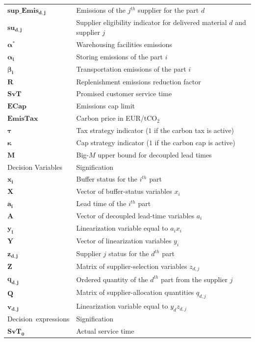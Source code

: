 \documentclass[preprint,12pt,authoryear]{elsarticle}
\begin{document}
\begin{longtable}{@{}p{}p{}@{}}
    $\bm{sup\_Emis_{d,j}}$ & Emissions of the $j^{th}$ supplier for the part $d$\\
    $\bm{su_{d,j}}$ & Supplier eligibility indicator for delivered material $d$ and supplier $j$\\
    $\bm{\alpha^{*}}$ & Warehousing facilities emissions\\
    $\bm{\alpha_{i}}$ & Storing emissions of the part $i$\\
    $\bm{\beta_{i}}$ & Transportation emissions of the part $i$\\
    $\bm{R}$ & Replenishment emissions reduction factor\\
    $\bm{SvT}$ & Promised customer service time\\
    $\bm{ECap}$ & Emissions cap limit\\
    $\bm{EmisTax}$ & Carbon price in EUR/tCO$_2$\\
    $\bm{\tau}$ & Tax strategy indicator ($1$ if the carbon tax is active)\\
    $\bm{\kappa}$ & Cap strategy indicator ($1$ if the carbon cap is active)\\
    $\bm{M}$ & Big-$M$ upper bound for decoupled lead times\\
\hline
Decision Variables &  Signification\\
\hline
    $\bm{x_{i}}$ & Buffer status for the $i^{th}$ part\\
    $\bm{X}$ & Vector of buffer-status variables $x_i$\\
    $\bm{a_{i}}$ & Lead time of the $i^{th}$ part\\
    $\bm{A}$ & Vector of decoupled lead-time variables $a_i$\\
    $\bm{y_i}$ & Linearization variable equal to $a_ix_i$\\
    $\bm{Y}$ & Vector of linearization variables $y_i$\\
    $\bm{z_{d,j}}$ & Supplier $j$ status for the $d^{th}$ part\\
    $\bm{Z}$ & Matrix of supplier-selection variables $z_{d,j}$\\
    $\bm{q_{d,j}}$ & Ordered quantity of the $d^{th}$ part from the supplier $j$\\
    $\bm{Q}$ & Matrix of supplier-allocation quantities $q_{d,j}$\\
    $\bm{v_{d,j}}$ & Linearization variable equal to $y_{d}z_{d,j}$\\
\hline
\mbox{Decision expressions} &  Signification\\
\hline
    $\bm{SvT_{0}}$ & Actual service time\\

\end{longtable}
\end{document}
